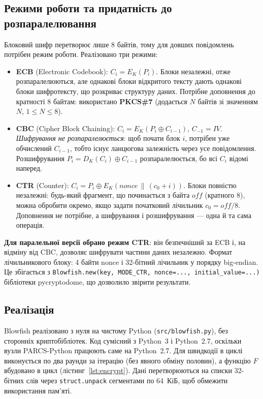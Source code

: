 \documentclass[a4paper,12pt]{article}
\begin{document}
\subsection{Режими роботи та придатність до розпаралелювання}
Блоковий шифр перетворює лише 8 байтів, тому для довших повідомлень потрібен режим
роботи. Реалізовано три режими:
\begin{itemize}
  \item \textbf{ECB} (Electronic Codebook): $C_i = E_K(P_i)$. Блоки незалежні, отже
        розпаралелюються, але однакові блоки відкритого тексту дають однакові
        блоки шифротексту, що розкриває структуру даних. Потрібне доповнення до
        кратності 8 байтам: використано \textbf{PKCS\#7} (додається $N$ байтів зі значенням $N$, $1 \le N \le 8$).
  \item \textbf{CBC} (Cipher Block Chaining): $C_i = E_K(P_i \oplus C_{i-1})$, $C_{-1} = IV$.
        \emph{Шифрування не розпаралелюється}: щоб почати блок $i$, потрібен уже
        обчислений $C_{i-1}$, тобто існує ланцюгова залежність через усе повідомлення.
        Розшифрування $P_i = D_K(C_i) \oplus C_{i-1}$ розпаралелюється, бо всі $C_i$ відомі наперед.
  \item \textbf{CTR} (Counter): $C_i = P_i \oplus E_K(\mathit{nonce} \,\|\, (c_0 + i))$.
        Блоки повністю незалежні: будь-який фрагмент, що починається з байта
        $\mathit{off}$ (кратного 8), можна обробити окремо, якщо задати початковий
        лічильник $c_0 = \mathit{off}/8$. Доповнення не потрібне, а шифрування і
        розшифрування --- одна й та сама операція.
\end{itemize}
\textbf{Для паралельної версії обрано режим CTR}: він безпечніший за ECB і, на
відміну від CBC, дозволяє шифрувати частини даних незалежно. Формат лічильникового
блоку: 4 байти nonce і 32-бітний лічильник у порядку big-endian. Це збігається з
\texttt{Blowfish.new(key, MODE\_CTR, nonce=..., initial\_value=...)} бібліотеки
pycryptodome, що дозволило звірити результати.

\subsection{Реалізація}
Blowfish реалізовано з нуля на чистому Python (\texttt{src/blowfish.py}), без
сторонніх криптобібліотек. Код сумісний з Python~3 і Python~2.7, оскільки
вузли PARCS-Python працюють саме на Python~2.7. Для швидкодії в циклі виконується
по два раунди за ітерацію (без явного обміну половин), а функцію $F$ вбудовано
в цикл (лістинг~\ref{lst:encrypt}). Дані перетворюються на списки 32-бітних слів
через \texttt{struct.unpack} сегментами по 64~КіБ, щоб обмежити використання пам'яті.
\end{document}
